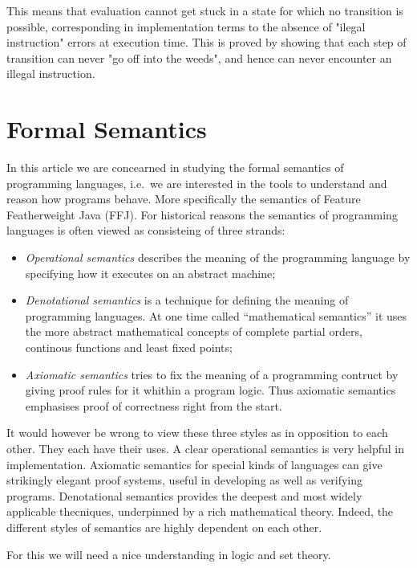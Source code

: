 This means that evaluation cannot get stuck in a state for which no
transition is possible, corresponding in implementation terms to the
absence of "ilegal instruction" errors at execution time. This is proved
by showing that each step of transition can never "go off into the
weeds", and hence can never encounter an illegal instruction.


\section{Formal Semantics} 
In this article we are concearned in studying the formal semantics of
programming languages, i.e.\ we are interested in the tools to understand and
reason how programs behave. More specifically the semantics of Feature
Featherweight Java (FFJ).  For historical reasons the semantics of programming
languages is often viewed as consisteing of three strands: 

\begin{itemize} 
    \item \textit{Operational semantics} describes the meaning of the
        programming language by specifying how it executes on an abstract machine;

    \item \textit{Denotational semantics} is a technique for defining the
    meaning of programming languages. At one time called ``mathematical
    semantics'' it uses the more abstract mathematical concepts of complete
    partial orders, continous functions and least fixed points; 

    \item \textit{Axiomatic semantics} tries to fix the meaning of a programming
        contruct by giving proof rules for it whithin a program logic. Thus
        axiomatic semantics emphasises proof of correctness right from the start.
\end{itemize}

It would however be wrong to view these three styles as in opposition to
each other. They each have their uses. A clear operational semantics is very
helpful in implementation. Axiomatic semantics for special kinds of
languages can give strikingly elegant proof systems, useful in developing as
well as verifying programs. Denotational semantics provides the deepest and
most widely applicable thecniques, underpinned by a rich mathematical
theory. Indeed, the different styles  of semantics are highly dependent on
each other. 

For this we will need a nice understanding in logic and set theory.



